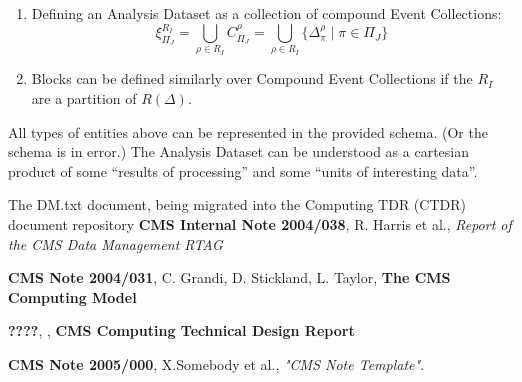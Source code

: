 \documentclass{cmspaper}
\begin{document}
\begin{enumerate}
\item Defining an Analysis Dataset as a collection of compound Event Collections: 
\begin{equation}
\xi_{\Pi_J}^{R_I} = \bigcup_{\rho \in R_I} C_{\Pi_J}^{\rho} = \bigcup_{\rho \in R_I} \{ \Delta_{\pi}^{\rho} \mid \pi \in \Pi_J \}
\end{equation}

\item Blocks can be defined similarly over Compound Event Collections if the $R_I$ are a partition 
of $R(\Delta)$.

\end{enumerate}

All types of entities above can be represented in the provided schema.  (Or the schema
is in error.)  The Analysis Dataset can be understood as a cartesian product of some
``results of processing'' and some ``units of interesting data''.  


\begin{thebibliography}{9}
   The DM.txt document, being migrated into the Computing
      TDR (CTDR) document repository
   {\bf CMS Internal Note 2004/038}, R. Harris et al., 
    {\it Report of the CMS Data Management RTAG}

   {\bf CMS Note 2004/031}, C. Grandi, D. Stickland,
               L. Taylor, {\bf The CMS Computing Model}

   {\bf ????}, , {\bf CMS Computing Technical Design Report}

   {\bf CMS Note 2005/000},
    X.Somebody et al.,
    {\em "CMS Note Template"}.
\end{thebibliography}
 
\pagebreak
\end{document}

